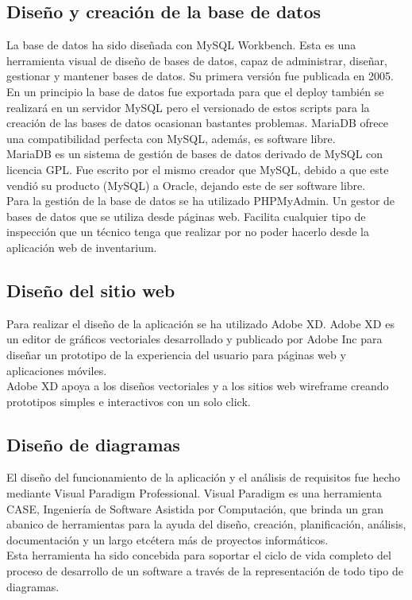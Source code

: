\subsection{Diseño y creación de la base de datos}

La base de datos ha sido diseñada con MySQL Workbench. Esta es una herramienta visual de diseño de bases de datos, capaz de administrar, diseñar, gestionar y mantener bases de datos. Su primera versión fue publicada en 2005.
\\En un principio la base de datos fue exportada para que el deploy también se realizará en un servidor MySQL pero el versionado de estos scripts para la creación de las bases de datos ocasionan bastantes problemas. MariaDB ofrece una compatibilidad perfecta con MySQL, además, es software libre.
\\MariaDB es un sistema de gestión de bases de datos derivado de MySQL con licencia GPL. Fue escrito por el mismo creador que MySQL, debido a que este vendió su producto (MySQL) a Oracle, dejando este de ser software libre.
\\Para la gestión de la base de datos se ha utilizado PHPMyAdmin. Un gestor de bases de datos que se utiliza desde páginas web. Facilita cualquier tipo de inspección que un técnico tenga que realizar por no poder hacerlo desde la aplicación web de inventarium.

\subsection{Diseño del sitio web}

Para realizar el diseño de la aplicación se ha utilizado Adobe XD. Adobe XD es un editor de gráficos vectoriales desarrollado y publicado por Adobe Inc para diseñar un prototipo de la experiencia del usuario para páginas web y aplicaciones móviles.
\\Adobe XD apoya a los diseños vectoriales y a los sitios web wireframe creando prototipos simples e interactivos con un solo click.

\subsection{Diseño de diagramas}

El diseño del funcionamiento de la aplicación y el análisis de requisitos fue hecho mediante Visual Paradigm Professional. Visual Paradigm es una herramienta CASE, Ingeniería de Software Asistida por Computación, que brinda un gran abanico de herramientas para la ayuda del diseño, creación, planificación, análisis, documentación y un largo etcétera más de proyectos informáticos.
\\Esta herramienta ha sido concebida para soportar el ciclo de vida completo del proceso de desarrollo de un software a través de la representación de todo tipo de diagramas.

